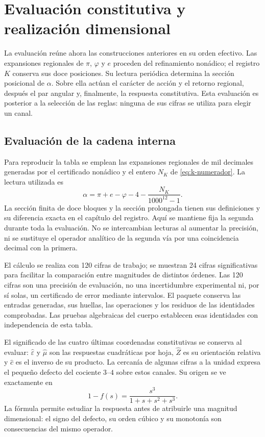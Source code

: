 \section{Evaluación constitutiva y realización dimensional}
\label{iii:sec:evaluacion}

La evaluación reúne ahora las construcciones anteriores en su orden efectivo.
Las expansiones regionales de $\pi$, $\varphi$ y $e$ proceden del refinamiento
nonádico; el registro $K$ conserva sus doce posiciones. Su lectura periódica
determina la sección posicional de $\alpha$. Sobre ella actúan el carácter
de acción y el retorno regional, después el par angular y, finalmente, la
respuesta constitutiva. Esta evaluación es posterior a la selección de las
reglas: ninguna de sus cifras se utiliza para elegir un canal.

\subsection{Evaluación de la cadena interna}

Para reproducir la tabla se emplean las expansiones regionales de mil
decimales generadas por el certificado nonádico y el entero $N_K$ de
\eqref{eq:k-numerador}. La lectura utilizada es
\[
 \alpha=\pi+e-\varphi-4-\frac{N_K}{1000^{12}-1}.
\]
La sección finita de doce bloques y la sección prolongada tienen sus
definiciones y su diferencia exacta en el capítulo del registro. Aquí se
mantiene fija la segunda durante toda la evaluación. No se intercambian
lecturas al aumentar la precisión, ni se sustituye el operador analítico
de la segunda vía por una coincidencia decimal con la primera.



El cálculo se realiza con 120 cifras de trabajo; se muestran 24 cifras
significativas para facilitar la comparación entre magnitudes de distintos
órdenes. Las 120 cifras son una precisión de evaluación, no una incertidumbre
experimental ni, por sí solas, un certificado de error mediante intervalos.
El paquete conserva las entradas generadas, sus huellas, las operaciones y
los residuos de las identidades comprobadas. Las pruebas algebraicas del
cuerpo establecen esas identidades con independencia de esta tabla.

El significado de las cuatro últimas coordenadas constitutivas se conserva
al evaluar: $\widehat\varepsilon$ y $\widehat\mu$ son las respuestas
cuadráticas por hoja, $\widehat Z$ es su orientación relativa y
$\widehat c$ es el inverso de su producto. La cercanía de algunas cifras a
la unidad expresa el pequeño defecto del cociente $3$--$4$ sobre estos
canales. Su origen se ve exactamente en
\[
 1-f(s)=\frac{s^3}{1+s+s^2+s^3}.
\]
La fórmula permite estudiar la respuesta antes de atribuirle una magnitud
dimensional: el signo del defecto, su orden cúbico y su monotonía son
consecuencias del mismo operador.

